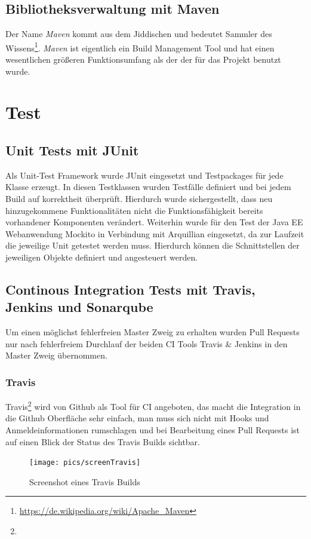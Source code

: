 \documentclass[12pt,a4paper,parskip]{scrreprt}
\begin{document}
\subsection{Bibliotheksverwaltung mit Maven}
Der Name \textit{Maven} kommt aus dem Jiddischen und bedeutet
\glqq Sammler des Wissens\grqq \footnote{\url{https://de.wikipedia.org/wiki/Apache_Maven}}.
\textit{Maven} ist eigentlich ein Build Management Tool und hat einen wesentlichen größeren Funktionsumfang als der der für das Projekt benutzt wurde.
\section{Test}
\subsection{Unit Tests mit JUnit}
Als Unit-Test Framework wurde JUnit eingesetzt und Testpackages für jede Klasse erzeugt. In diesen Testklassen wurden Testfälle definiert und bei jedem Build auf korrektheit überprüft. Hierdurch wurde sichergestellt, dass neu hinzugekommene Funktionalitäten nicht die Funktionsfähigkeit bereits vorhandener Komponenten verändert.
Weiterhin wurde für den Test der Java EE Webanwendung Mockito in Verbindung mit Arquillian eingesetzt, da zur Laufzeit die jeweilige Unit getestet werden muss. Hierdurch können die Schnittstellen der jeweiligen Objekte definiert und angesteuert werden.
\subsection{Continous Integration Tests mit Travis, Jenkins und Sonarqube}
Um einen möglichst fehlerfreien Master Zweig zu erhalten wurden Pull Requests nur nach fehlerfreiem Durchlauf der beiden CI Tools Travis \& Jenkins in den Master Zweig übernommen.

\subsubsection{Travis}
Travis\footnote{} wird von Github als Tool für CI angeboten, das macht die Integration in die Github Oberfläche sehr einfach, man muss sich nicht mit Hooks und Anmeldeinformationen rumschlagen und bei Bearbeitung eines Pull Requests ist auf einen Blick der Status des Travis Builds sichtbar.
\begin{figure}[!hbtp]%
\centering
\texttt{[image: pics/screenTravis]}
\caption[Travis]{Screenshot eines Travis Builds}
\label{fig:screenTravis}
\end{figure}
\end{document}
